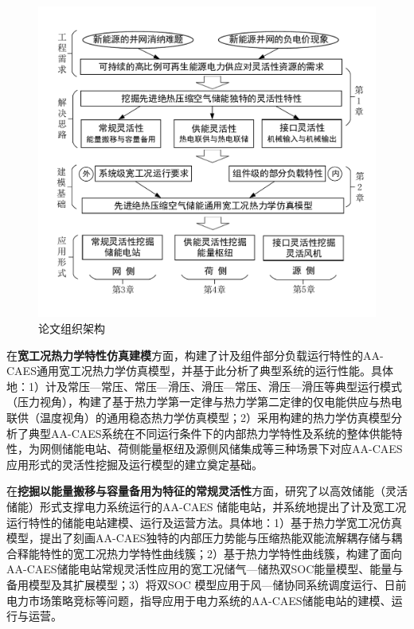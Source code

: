 \begin{figure}[H] %
  \centering
  \includegraphics[scale=0.75]{figures/Chap1-4-Thesis-Framework-3.pdf}
  \caption{论文组织架构}
  \label{fig:Thesis-Framework}
\end{figure}

在\textbf{宽工况热力学特性仿真建模}方面，构建了计及组件部分负载运行特性的AA-CAES通用宽工况热力学仿真模型，并基于此分析了典型系统的运行性能。具体地：1）计及常压—常压、常压—滑压、滑压—常压、滑压—滑压等典型运行模式（压力视角），构建了基于热力学第一定律与热力学第二定律的仅电能供应与热电联供（温度视角）的通用稳态热力学仿真模型；2）采用构建的热力学仿真模型分析了典型AA-CAES系统在不同运行条件下的内部热力学特性及系统的整体供能特性，为网侧储能电站、荷侧能量枢纽及源侧风储集成等三种场景下对应AA-CAES应用形式的灵活性挖掘及运行模型的建立奠定基础。

在\textbf{挖掘以能量搬移与容量备用为特征的常规灵活性}方面，研究了以高效储能（灵活储能）形式支撑电力系统运行的AA-CAES 储能电站，并系统地提出了计及宽工况运行特性的储能电站建模、运行及运营方法。具体地：1）基于热力学宽工况仿真模型，提出了刻画AA-CAES独特的内部压力势能与压缩热能双能流解耦存储与耦合释能特性的宽工况热力学特性曲线簇；2）基于热力学特性曲线簇，构建了面向AA-CAES储能电站常规灵活性应用的宽工况储气—储热双SOC能量模型、能量与备用模型及其扩展模型；3）将双SOC 模型应用于风—储协同系统调度运行、日前电力市场策略竞标等问题，指导应用于电力系统的AA-CAES储能电站的建模、运行与运营。

